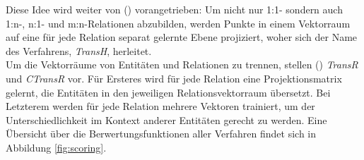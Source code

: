 Diese Idee wird weiter von (\cite{wang2014knowledge}) vorangetrieben: Um nicht nur 1:1- sondern auch 1:n-, n:1- und m:n-Relationen
abzubilden, werden Punkte in einem Vektorraum auf eine für jede Relation separat gelernte Ebene projiziert, woher sich
der Name des Verfahrens, \emph{TransH}, herleitet.\\
Um die Vektorräume von Entitäten und Relationen zu trennen, stellen (\cite{lin2015learning}) \emph{TransR} und \emph{CTransR}
vor. Für Ersteres wird für jede Relation eine Projektionsmatrix gelernt, die Entitäten in den jeweiligen Relationsvektorraum
übersetzt. Bei Letzterem werden für jede Relation mehrere Vektoren trainiert, um der Unterschiedlichkeit im Kontext
anderer Entitäten gerecht zu werden. Eine Übersicht über die Berwertungsfunktionen aller Verfahren findet sich in Abbildung
\ref{fig:scoring}.
